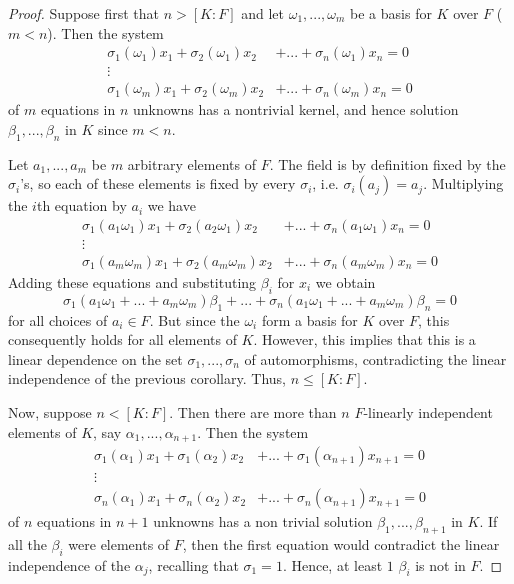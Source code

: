 \begin{proof}
    Suppose first that $n > [K:F]$ and let $\omega_1,...,\omega_m$ be a basis for $K$ over $F$ ($m < n$). Then the system \begin{align*}
        \sigma_1(\omega_1)x_1 + \sigma_2(\omega_1)x_2&+...+\sigma_n(\omega_1)x_n = 0 \\
        \vdots& \\
        \sigma_1(\omega_m)x_1 + \sigma_2(\omega_m)x_2&+...+\sigma_n(\omega_m)x_n = 0 
    \end{align*}
    of $m$ equations in $n$ unknowns has a nontrivial kernel, and hence solution $\beta_1,...,\beta_n$ in $K$ since $m < n$. 

    Let $a_1,...,a_m$ be $m$ arbitrary elements of $F$. The field is by definition fixed by the $\sigma_i$'s, so each of these elements is fixed by every $\sigma_i$, i.e. $\sigma_i(a_j) = a_j$. Multiplying the $i$th equation by $a_i$ we have
    \begin{align*}
        \sigma_1(a_1\omega_1)x_1 + \sigma_2(a_2\omega_1)x_2&+...+\sigma_n(a_1\omega_1)x_n = 0 \\
        \vdots& \\
        \sigma_1(a_m\omega_m)x_1 + \sigma_2(a_m\omega_m)x_2&+...+\sigma_n(a_m\omega_m)x_n = 0 
    \end{align*}
    Adding these equations and substituting $\beta_i$ for $x_i$ we obtain \begin{equation*}
        \sigma_1(a_1\omega_1+...+a_m\omega_m)\beta_1+...+\sigma_n(a_1\omega_1+...+a_m\omega_m)\beta_n = 0
    \end{equation*}
    for all choices of $a_i \in F$. But since the $\omega_i$ form a basis for $K$ over $F$, this consequently holds for all elements of $K$. However, this implies that this is a linear dependence on the set $\sigma_1,...,\sigma_n$ of automorphisms, contradicting the linear independence of the previous corollary. Thus, $n \leq [K:F]$. 

    Now, suppose $n < [K:F]$. Then there are more than $n$ $F$-linearly independent elements of $K$, say $\alpha_1,...,\alpha_{n+1}$. Then the system 
    \begin{align*}
        \sigma_1(\alpha_1)x_1 + \sigma_1(\alpha_2)x_2&+...+\sigma_1(\alpha_{n+1})x_{n+1} = 0 \\
        \vdots& \\
        \sigma_n(\alpha_1)x_1 + \sigma_n(\alpha_2)x_2&+...+\sigma_n(\alpha_{n+1})x_{n+1} = 0 
    \end{align*}
    of $n$ equations in $n+1$ unknowns has a non trivial solution $\beta_1,...,\beta_{n+1}$ in $K$. If all the $\beta_i$ were elements of $F$, then the first equation would contradict the linear independence of the $\alpha_j$, recalling that $\sigma_1 = 1$. Hence, at least $1$ $\beta_i$ is not in $F$.


\end{proof}
